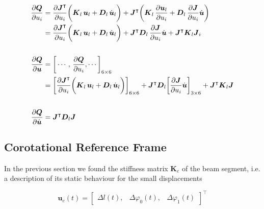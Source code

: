 \begin{align}
\frac{\partial\boldsymbol{Q}}{\partial u_{i}} &= \frac{\partial\boldsymbol{J}^\intercal}{\partial u_{i}}\bigg(\boldsymbol{K}_{l}\,\boldsymbol{u}_{l} + \boldsymbol{D}_{l}\,\dot{\boldsymbol{u}}_{l}\bigg) + \boldsymbol{J}^\intercal\bigg(\boldsymbol{K}_{l}\,\frac{\partial\boldsymbol{u}_{l}}{\partial u_{i}} + \boldsymbol{D}_{l}\,\frac{\partial\boldsymbol{J}}{\partial u_{i}}\dot{\boldsymbol{u}}\bigg) \notag \\
&= \frac{\partial\boldsymbol{J}^\intercal}{\partial u_{i}}\bigg(\boldsymbol{K}_{l}\,\boldsymbol{u}_{l} + \boldsymbol{D}_{l}\,\dot{\boldsymbol{u}}_{l}\bigg) + \boldsymbol{J}^\intercal \boldsymbol{D}_{l}\,\frac{\partial\boldsymbol{J}}{\partial u_{i}}\dot{\boldsymbol{u}} + \boldsymbol{J}^\intercal\boldsymbol{K}_{l}\boldsymbol{J}_{i} \\
\notag \\
\frac{\partial\boldsymbol{Q}}{\partial\boldsymbol{u}} &=
\bigg[\cdots,\,\frac{\partial\boldsymbol{Q}}{\partial u_{i}},\cdots\bigg]_{6 \times 6} \notag \\
&= \bigg[\frac{\partial\boldsymbol{J}^\intercal}{\partial u_{i}}\bigg(\boldsymbol{K}_{l}\,\boldsymbol{u}_{l} + \boldsymbol{D}_{l}\,\dot{\boldsymbol{u}}_{l}\bigg)\bigg]_{6 \times 6} + \boldsymbol{J}^\intercal \boldsymbol{D}_{l}\bigg[\frac{\partial\boldsymbol{J}}{\partial u_{i}}\dot{\boldsymbol{u}}\bigg]_{3 \times 6} + \boldsymbol{J}^\intercal\boldsymbol{K}_{l}\boldsymbol{J} \\
\notag \\
\frac{\partial\boldsymbol{Q}}{\partial\dot{\boldsymbol{u}}} &= \boldsymbol{J}^\intercal\boldsymbol{D}_{l}\boldsymbol{J}
\end{align}

\newpage
\subsection{Corotational Reference Frame}

In the previous section we found the stiffness matrix $\boldsymbol{K}_e$ of the beam segment, i.e. a description of its static behaviour for the small displacements

\begin{equation}
\boldsymbol{u}_e(t) = \begin{bmatrix}
\Delta l(t), & \Delta \varphi_0(t), & \Delta \varphi_1(t)
\end{bmatrix}^\intercal
\end{equation}

